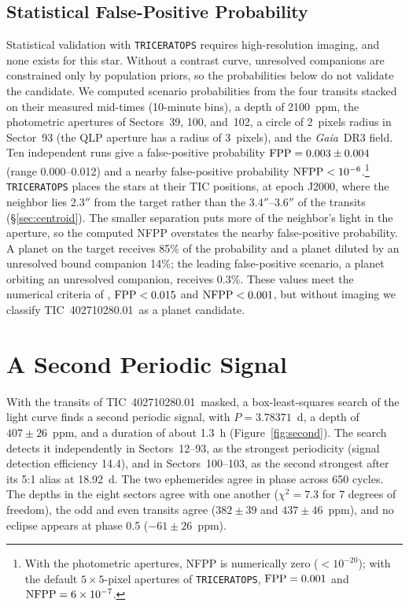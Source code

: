 \documentclass[twocolumn,linenumbers]{aastex701}
\newcommand{\planet}{TIC~402710280.01}
\newcommand{\gaia}{\textit{Gaia}}
\begin{document}
\subsection{Statistical False-Positive Probability} \label{sec:fpp}

Statistical validation with \texttt{TRICERATOPS} \citep{Giacalone2020, Giacalone2021} requires high-resolution imaging, and none exists for this star. Without a contrast curve, unresolved companions are constrained only by population priors, so the probabilities below do not validate the candidate. We computed scenario probabilities from the four transits stacked on their measured mid-times (10-minute bins), a depth of 2100~ppm, the photometric apertures of Sectors~39, 100, and~102, a circle of 2~pixels radius in Sector~93 (the QLP aperture has a radius of 3~pixels), and the \gaia\ DR3 field. Ten independent runs give a false-positive probability ${\rm FPP} = 0.003 \pm 0.004$ (range 0.000--0.012) and a nearby false-positive probability ${\rm NFPP} < 10^{-6}$.\footnote{With the photometric apertures, NFPP is numerically zero ($<10^{-20}$); with the default $5 \times 5$-pixel apertures of \texttt{TRICERATOPS}, ${\rm FPP} = 0.001$ and ${\rm NFPP} = 6 \times 10^{-7}$.} \texttt{TRICERATOPS} places the stars at their TIC positions, at epoch J2000, where the neighbor lies $2.3''$ from the target rather than the $3.4''$--$3.6''$ of the transits (\S\ref{sec:centroid}). The smaller separation puts more of the neighbor's light in the aperture, so the computed NFPP overstates the nearby false-positive probability. A planet on the target receives 85\% of the probability and a planet diluted by an unresolved bound companion 14\%; the leading false-positive scenario, a planet orbiting an unresolved companion, receives 0.3\%. These values meet the numerical criteria of \citet{Giacalone2021}, ${\rm FPP} < 0.015$ and ${\rm NFPP} < 0.001$, but without imaging we classify \planet\ as a planet candidate.

\section{A Second Periodic Signal} \label{sec:second}

With the transits of \planet\ masked, a box-least-squares search \citep{Kovacs2002} of the light curve finds a second periodic signal, with $P = 3.78371$~d, a depth of $407 \pm 26$~ppm, and a duration of about 1.3~h (Figure~\ref{fig:second}). The search detects it independently in Sectors~12--93, as the strongest periodicity (signal detection efficiency 14.4), and in Sectors~100--103, as the second strongest after its 5:1 alias at 18.92~d. The two ephemerides agree in phase across 650 cycles. The depths in the eight sectors agree with one another ($\chi^2 = 7.3$ for 7 degrees of freedom), the odd and even transits agree ($382 \pm 39$ and $437 \pm 46$~ppm), and no eclipse appears at phase 0.5 ($-61 \pm 26$~ppm).
\end{document}
